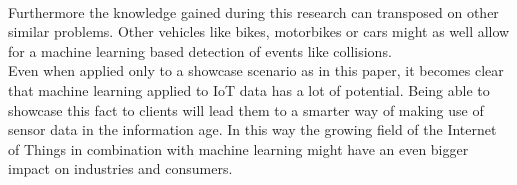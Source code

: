 \\
Furthermore the knowledge gained during this research can transposed on other similar problems. Other vehicles like bikes, motorbikes or cars might as well allow for a machine learning based detection of events like collisions. 
\\
Even when applied only to a showcase scenario as in this paper, it becomes clear that machine learning applied to IoT data has a lot of potential. Being able to showcase this fact to clients will lead them to a smarter way of making use of sensor data in the information age. In this way the growing field of the Internet of Things in combination with machine learning might have an even bigger impact on industries and consumers.
